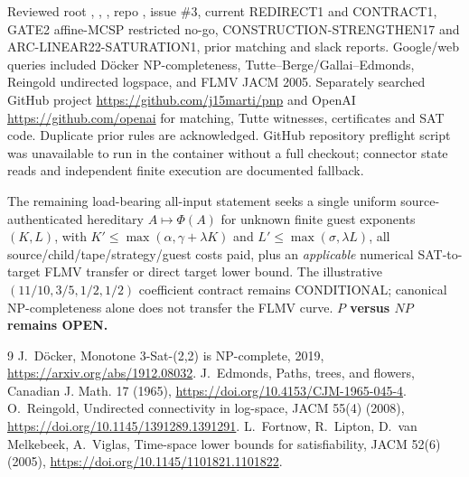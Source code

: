 \documentclass[10pt]{article}
\begin{document}
Reviewed root , , , repo , issue \#3, current REDIRECT1 and CONTRACT1, GATE2 affine-MCSP restricted no-go, CONSTRUCTION-STRENGTHEN17 and ARC-LINEAR22-SATURATION1, prior matching and slack reports. Google/web queries included D\"ocker NP-completeness, Tutte--Berge/Gallai--Edmonds, Reingold undirected logspace, and FLMV JACM 2005. Separately searched GitHub project \url{https://github.com/j15marti/pnp} and OpenAI \url{https://github.com/openai} for matching, Tutte witnesses, certificates and SAT code. Duplicate prior rules are acknowledged. GitHub repository preflight script was unavailable to run in the container without a full checkout; connector state reads and independent finite execution are documented fallback.

The remaining load-bearing all-input statement seeks a single uniform source-authenticated hereditary $A\mapsto\Phi(A)$ for unknown finite guest exponents $(K,L)$, with $K'\le\max(\alpha,\gamma+\lambda K)$ and $L'\le\max(\sigma,\lambda L)$, all source/child/tape/strategy/guest costs paid, plus an \emph{applicable} numerical SAT-to-target FLMV transfer or direct target lower bound. The illustrative $(11/10,3/5,1/2,1/2)$ coefficient contract remains CONDITIONAL; canonical NP-completeness alone does not transfer the FLMV curve. \textbf{$P$ versus $NP$ remains OPEN.}

\begin{thebibliography}{9}
 J.~D\"ocker, Monotone 3-Sat-(2,2) is NP-complete, 2019, \url{https://arxiv.org/abs/1912.08032}.
 J.~Edmonds, Paths, trees, and flowers, Canadian J. Math. 17 (1965), \url{https://doi.org/10.4153/CJM-1965-045-4}.
 O.~Reingold, Undirected connectivity in log-space, JACM 55(4) (2008), \url{https://doi.org/10.1145/1391289.1391291}.
 L.~Fortnow, R.~Lipton, D.~van Melkebeek, A.~Viglas, Time-space lower bounds for satisfiability, JACM 52(6) (2005), \url{https://doi.org/10.1145/1101821.1101822}.
\end{thebibliography}
\end{document}
